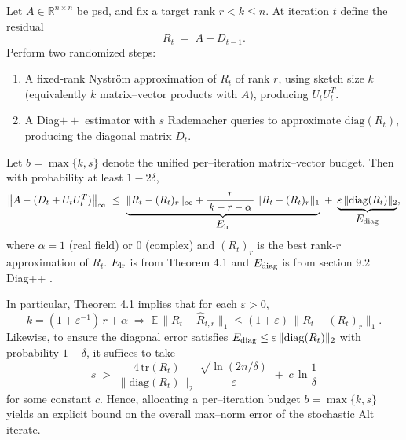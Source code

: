 \documentclass[final,hidelinks,onefignum,onetabnum]{siamart250211}
\providecommand{\R}{\mathbb{R}}
\providecommand{\tr}{\mathrm{tr}}
\providecommand{\diag}{\mathrm{diag}}
\providecommand{\1}{\mathbf{1}}
\theoremstyle{plain}
\begin{document}
\begin{theorem} \label{thm:stochbound}
Let \(A\in\R^{n\times n}\) be psd, and fix a target rank \(r<k\le n\).  At iteration \(t\) define the residual
\[
R_t \;=\; A - D_{t-1}.
\]
Perform two randomized steps:
\begin{enumerate}
  \item[\(\bullet\)] A fixed‐rank Nyström approximation of \(R_t\) of rank \(r\), using sketch size \(k\) (equivalently \(k\) matrix–vector products with \(A\)), producing \(U_tU_t^T\).
  \item[\(\bullet\)] A Diag\(++\) estimator with \(s\) Rademacher queries to approximate \(\diag(R_t)\), producing the diagonal matrix \(D_t\).
\end{enumerate}
Let \(b=\max\{k,s\}\) denote the unified per–iteration matrix–vector budget.  
Then with probability at least \(1-2\delta\),
\[
\bigl\|A - (D_t + U_t U_t^T)\bigr\|_{\infty}
\;\le\;
\underbrace{\|R_t - (R_t)_r\|_{\infty}
+\frac{r}{\,k-r-\alpha\,}\,\|R_t - (R_t)_r\|_{1}}_{\displaystyle E_{\rm lr}}
\;+\;
\underbrace{\varepsilon\,\|\diag(R_t)\|_{2}}_{\displaystyle E_{\rm diag}},
\]
where \(\alpha=1\) (real field) or \(0\) (complex) and \((R_t)_r\) is the best rank-\(r\) approximation of \(R_t\). \({\displaystyle E_{\rm lr}}\) is from Theorem 4.1 \cite{tropp2017fixed} and \({\displaystyle E_{\rm diag}}\) is from section 9.2 Diag++ \cite{baston2022stochastic}.

In particular, Theorem 4.1 \cite{tropp2017fixed} implies that for each \(\varepsilon>0\),
\[
k = (1+\varepsilon^{-1})\,r + \alpha
\;\Longrightarrow\;
\mathbb{E}\,\|R_t - \widehat R_{t,r}\|_{1} \le (1+\varepsilon)\,\|R_t - (R_t)_r\|_{1}.
\]
Likewise, to ensure the diagonal error satisfies
\(E_{\rm diag}\le \varepsilon\,\|\diag(R_t)\|_{2}\) with probability \(1-\delta\), it suffices to take
\[
s \;>\;
\frac{4\,\tr(R_t)}{\|\diag(R_t)\|_{2}}
\,\frac{\sqrt{\ln(2n/\delta)}}{\varepsilon}
\;+\;c\,\ln\frac1\delta
\]
for some constant \(c\).  Hence, allocating a per–iteration budget \(b=\max\{k,s\}\) yields an explicit bound on the overall max–norm error of the stochastic Alt iterate.
\end{theorem}
\end{document}
